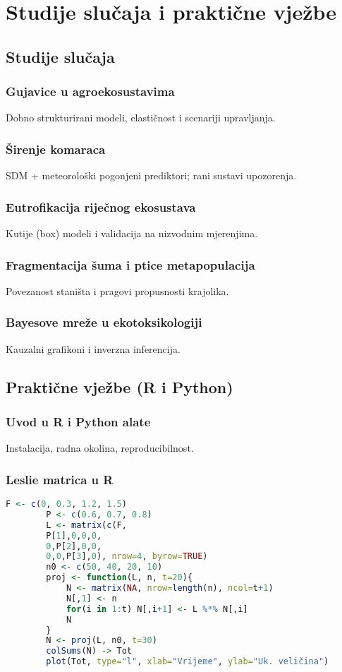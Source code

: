 \documentclass[12pt,oneside]{book}
\newcommand{\R}{\textsf{R}}
\newcommand{\Python}{\textsf{Python}}
\begin{document}
	\part{Studije slučaja i praktične vježbe}
	
	\chapter{Studije slučaja}
	\section{Gujavice u agroekosustavima}
	Dobno strukturirani modeli, elastičnost i scenariji upravljanja.
	\section{Širenje komaraca}
	SDM + meteorološki pogonjeni prediktori; rani sustavi upozorenja.
	\section{Eutrofikacija riječnog ekosustava}
	Kutije (box) modeli i validacija na nizvodnim mjerenjima.
	\section{Fragmentacija šuma i ptice metapopulacija}
	Povezanost staništa i pragovi propusnosti krajolika.
	\section{Bayesove mreže u ekotoksikologiji}
	Kauzalni grafikoni i inverzna inferencija.
	
	\chapter{Praktične vježbe (\R{} i \Python{})}
	\section{Uvod u \R{} i \Python{} alate}
	Instalacija, radna okolina, reproducibilnost.
	\section{Leslie matrica u \R{}}
	\begin{lstlisting}[language=R,caption={Leslie matrica i projekcija populacije u R-u}]
		F <- c(0, 0.3, 1.2, 1.5)
		P <- c(0.6, 0.7, 0.8)
		L <- matrix(c(F,
		P[1],0,0,0,
		0,P[2],0,0,
		0,0,P[3],0), nrow=4, byrow=TRUE)
		n0 <- c(50, 40, 20, 10)
		proj <- function(L, n, t=20){
			N <- matrix(NA, nrow=length(n), ncol=t+1)
			N[,1] <- n
			for(i in 1:t) N[,i+1] <- L %*% N[,i]
			N
		}
		N <- proj(L, n0, t=30)
		colSums(N) -> Tot
		plot(Tot, type="l", xlab="Vrijeme", ylab="Uk. veličina")
	\end{lstlisting}
	
\end{document}
